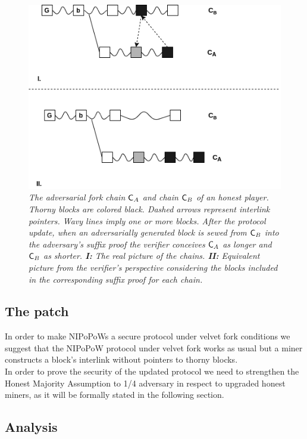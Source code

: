 \begin{figure}[h!]
	\begin{center}
		\includegraphics[scale=0.5]{figures/injection.png}
	\end{center}
	\caption{\textit{The adversarial fork chain $\mathsf{C}_A$ and chain $\mathsf{C}_B$ of an honest player. Thorny blocks are colored black. Dashed arrows represent interlink pointers. Wavy lines imply one or more blocks. After the protocol update, when an adversarially generated block is sewed from $\mathsf{C}_B$ into the adversary's suffix proof the verifier conceives $\mathsf{C}_A$ as longer and $\mathsf{C}_B$ as shorter. \textbf{I:} The real picture of the chains. \textbf{II:} Equivalent picture from the verifier's perspective considering the blocks included in the corresponding suffix proof for each chain.}}
	\label{fig:injection}
\end{figure}

\subsection{The patch}

In order to make NIPoPoWs a secure protocol under velvet fork conditions we suggest that the NIPoPoW protocol under velvet fork works as usual but a miner constructs a block's interlink without pointers to thorny blocks.\\

In order to prove the security of the updated protocol we need to strengthen the Honest Majority Assumption to 1/4 adversary in respect to  upgraded honest miners, as it will be formally stated in the following section.

\subsection{Analysis}

